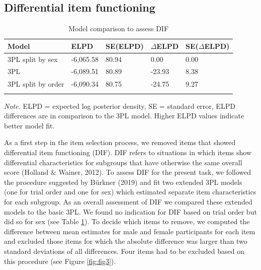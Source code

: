 \documentclass[
  man,floatsintext]{apa6}
\begin{document}
\hypertarget{differential-item-functioning}{%
\subsection{Differential item functioning}\label{differential-item-functioning}}

\begin{table}[tbp]

\begin{center}
\begin{threeparttable}

\caption{\label{tab:tab2}Model comparison to assess DIF}

\begin{tabular}{lllll}
\toprule
Model & ELPD & SE(ELPD) & $\Delta$ELPD & SE($\Delta$ELPD)\\
\midrule
3PL split by sex & -6,065.58 & 80.94 & 0.00 & 0.00\\
3PL & -6,089.51 & 80.89 & -23.93 & 8.38\\
3PL split by order & -6,090.34 & 80.75 & -24.75 & 9.27\\
\bottomrule
\addlinespace
\end{tabular}

\begin{tablenotes}[para]
\normalsize{\textit{Note.} ELPD = expected log posterior density, SE = standard error, ELPD differences are in comparison to the 3PL model. Higher ELPD values indicate better model fit.}
\end{tablenotes}

\end{threeparttable}
\end{center}

\end{table}

As a first step in the item selection process, we removed items that showed differential item functioning (DIF). DIF refers to situations in which items show differential characteristics for subgroups that have otherwise the same overall score (Holland \& Wainer, 2012). To assess DIF for the present task, we followed the procedure suggested by Bürkner (2019) and fit two extended 3PL models (one for trial order and one for sex) which estimated separate item characteristics for each subgroup. As an overall assessment of DIF we compared these extended models to the basic 3PL. We found no indication for DIF based on trial order but did so for sex (see Table \ref{tab:tab2}). To decide which items to remove, we computed the difference between mean estimates for male and female participants for each item and excluded those items for which the absolute difference was larger than two standard deviations of all differences. Four items had to be excluded based on this procedure (see Figure \ref{fig:fig3}).
\end{document}
